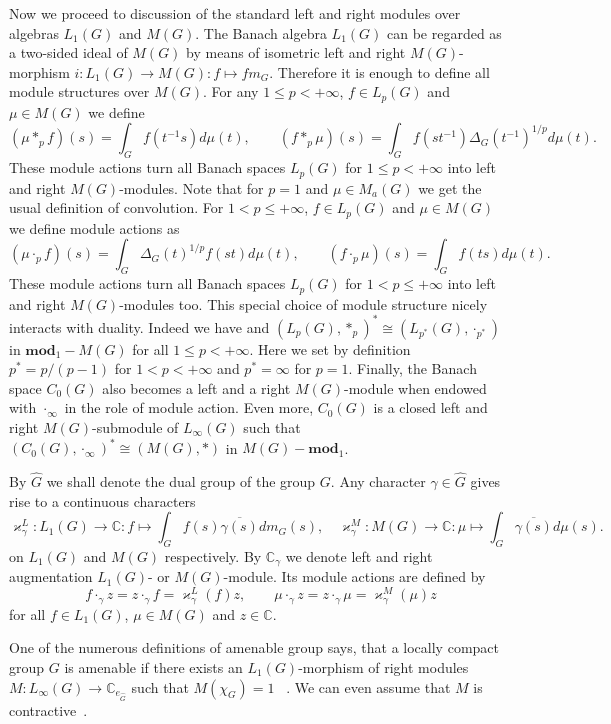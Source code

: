\documentclass{article}
\theoremstyle{plain}
\theoremstyle{definition}
\newcommand{\convol}{\ast}
\newcommand{\isom}{\mathop{\mathbin{\cong}}}
\begin{document}
\begin{fulltext}
Now we proceed to discussion of the standard left and right modules over
algebras $L_1(G)$ and $M(G)$. The Banach algebra $L_1(G)$ can be regarded as a
two-sided ideal of $M(G)$ by means of isometric left and right $M(G)$-morphism
$i:L_1(G)\to M(G):f\mapsto f m_G$. Therefore it is enough to define all module
structures over $M(G)$. For any $1\leq p<+\infty$, $f\in L_p(G)$ and $\mu\in
M(G)$ we define
\[
(\mu\convol_p f)(s)=\int_G f(t^{-1}s)d\mu(t),
\qquad
(f \convol_p \mu)(s)=\int_G f(st^{-1}){\Delta_G(t^{-1})}^{1/p}d\mu(t).
\]
These module actions turn all Banach spaces $L_p(G)$ for $1\leq p<+\infty$ into
left and right $M(G)$-modules. Note that for $p=1$ and $\mu\in M_a(G)$ we get
the usual definition of convolution. For $1<p\leq +\infty$, $f\in L_p(G)$ and
$\mu\in M(G)$ we define module actions as
\[
(\mu\cdot_p f)(s)=\int_G {\Delta_G(t)}^{1/p}f(st)d\mu(t),
\qquad
(f\cdot_p \mu)(s)=\int_G f(ts)d\mu(t).
\]
These module actions turn all Banach spaces $L_p(G)$ for $1<p\leq+\infty$ into
left and right $M(G)$-modules too. This special choice of module structure
nicely interacts with duality. Indeed we have and ${(L_p(G),\convol_p)}^*\isom
(L_{p^*}(G),\cdot_{p^*})$ in $\mathbf{mod}_1-M(G)$ for all $1\leq p<+\infty$.
Here we set by definition $p^*=p/(p-1)$ for $1<p<+\infty$ and $p^*=\infty$ for
$p=1$. Finally, the Banach space $C_0(G)$ also becomes a left and a right
$M(G)$-module when endowed with $\cdot_\infty$ in the role of module action.
Even more, $C_0(G)$ is a closed left and right $M(G)$-submodule of $L_\infty(G)$
such that ${(C_0(G),\cdot_\infty)}^*\isom (M(G),\convol)$ in
$M(G)-\mathbf{mod}_1$.

By $\widehat{G}$ we shall denote the dual group of the group $G$. Any character
$\gamma\in\widehat{G}$ gives rise to a continuous characters  
\[
\varkappa_\gamma^L:L_1(G)\to\mathbb{C}:f\mapsto \int_G f(s)\overline{\gamma(s)}d m_G(s),
\quad
\varkappa_\gamma^M:M(G)\to\mathbb{C}:\mu\mapsto\int_{G} \overline{\gamma(s)}d\mu(s).
\]
on $L_1(G)$ and $M(G)$ respectively. By $\mathbb{C}_\gamma$ we denote left and
right augmentation $L_1(G)$- or $M(G)$-module. Its module actions are defined by
\[
f\cdot_{\gamma}z=z\cdot_{\gamma}f=\varkappa_\gamma^L(f)z,
\qquad
\mu\cdot_{\gamma}z=z\cdot_{\gamma}\mu=\varkappa_\gamma^M(\mu)z
\]
for all $f\in L_1(G)$, $\mu\in M(G)$ and $z\in\mathbb{C}$. 

One of the numerous definitions of amenable group says, that a locally compact
group $G$ is amenable if there exists an $L_1(G)$-morphism of right modules
$M:L_\infty(G)\to\mathbb{C}_{e_{\widehat{G}}}$ such that $M(\chi_G)=1$
~\cite[section 7.2.5]{HelBanLocConvAlg}. We can even assume that $M$ is
contractive~\cite[remark 7.1.54]{HelBanLocConvAlg}.


\end{fulltext}
\end{document}
